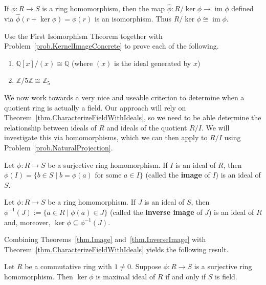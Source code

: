 \begin{theorem}\label{thm.FirstIsoRings}
If $\phi:R\to S$ is a ring homomorphism, then  the map $\hat{\phi}: R/\ker \phi\rightarrow \operatorname{im} \phi$ defined via $\hat{\phi}(r+\ker\phi) =  \phi(r)$ is an isomorphism. Thus $R/\ker \phi\cong \operatorname{im} \phi$.
\end{theorem}

\begin{problem}
Use the First Isomorphism Theorem together with Problem~\ref{prob.KernelImageConcrete} to prove each of the following. 
\begin{enumerate}
\item $\mathbb{Q}[x]/(x) \cong \mathbb{Q}$ (where $(x)$ is the ideal generated by $x$)
\item $\mathbb{Z}/5\mathbb{Z} \cong \mathbb{Z}_5$
\end{enumerate}
\end{problem}

We now work towards a very nice and useable criterion to determine when a quotient ring is actually a field. Our approach will rely on Theorem~\ref{thm.CharacterizeFieldWithIdeals}, so we need to be able determine the relationship between ideals of $R$ and ideals of the quotient $R/I$. We will investigate this via homomorphisms, which we can then apply to $R/I$ using Problem~\ref{prob.NaturalProjection}.

\begin{theorem}\label{thm.Image}
Let $\phi:R\to S$ be a surjective ring homomorphism. If $I$ is an ideal of $R$, then $\phi(I)=\{b\in S\mid b=\phi(a) \text{ for some $a\in I$}\}$ (called the \textbf{image} of $I$) is an ideal of $S$.
\end{theorem}

\begin{theorem}\label{thm.InverseImage}
Let $\phi:R\to S$ be a ring homomorphism. If $J$ is an ideal of $S$, then $\phi^{-1}(J) := \{a\in R\mid\phi(a) \in J\}$ (called the \textbf{inverse image} of $J$) is an ideal of $R$ and, moreover,  $\ker\phi \subseteq \phi^{-1}(J)$.
\end{theorem}

Combining Theorems~\ref{thm.Image} and~\ref{thm.InverseImage} with Theorem~\ref{thm.CharacterizeFieldWithIdeals} yields the following result.

\begin{theorem}
Let $R$ be a commutative ring with $1\neq0$. Suppose $\phi:R\to S$ is a surjective ring homomorphism. Then $\ker\phi$ is maximal ideal of $R$ if and only if $S$ is field.
\end{theorem}

